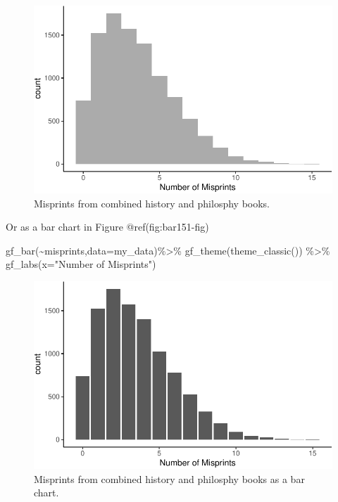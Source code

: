 \documentclass[
  letterpaper,
  DIV=11,
  numbers=noendperiod]{scrreprt}
\newenvironment{Shaded}{\begin{snugshade}}{\end{snugshade}}
\newcommand{\AttributeTok}[1]{\textcolor[rgb]{0.40,0.45,0.13}{#1}}
\newcommand{\FunctionTok}[1]{\textcolor[rgb]{0.28,0.35,0.67}{#1}}
\newcommand{\NormalTok}[1]{\textcolor[rgb]{0.00,0.23,0.31}{#1}}
\newcommand{\SpecialCharTok}[1]{\textcolor[rgb]{0.37,0.37,0.37}{#1}}
\newcommand{\StringTok}[1]{\textcolor[rgb]{0.13,0.47,0.30}{#1}}
\begin{document}
\begin{figure}[H]

{\centering \includegraphics{15-Multivariate-Expectation_files/figure-pdf/hist151-fig-1.pdf}

}

\caption{Misprints from combined history and philosphy books.}

\end{figure}%

Or as a bar chart in Figure @ref(fig:bar151-fig)

\begin{Shaded}
\begin{Highlighting}[]
\FunctionTok{gf\_bar}\NormalTok{(}\SpecialCharTok{\textasciitilde{}}\NormalTok{misprints,}\AttributeTok{data=}\NormalTok{my\_data)}\SpecialCharTok{\%\textgreater{}\%}
  \FunctionTok{gf\_theme}\NormalTok{(}\FunctionTok{theme\_classic}\NormalTok{()) }\SpecialCharTok{\%\textgreater{}\%}
  \FunctionTok{gf\_labs}\NormalTok{(}\AttributeTok{x=}\StringTok{"Number of Misprints"}\NormalTok{)}
\end{Highlighting}
\end{Shaded}

\begin{figure}[H]

{\centering \includegraphics{15-Multivariate-Expectation_files/figure-pdf/bar151-fig-1.pdf}

}

\caption{Misprints from combined history and philosphy books as a bar
chart.}

\end{figure}%
\end{document}
